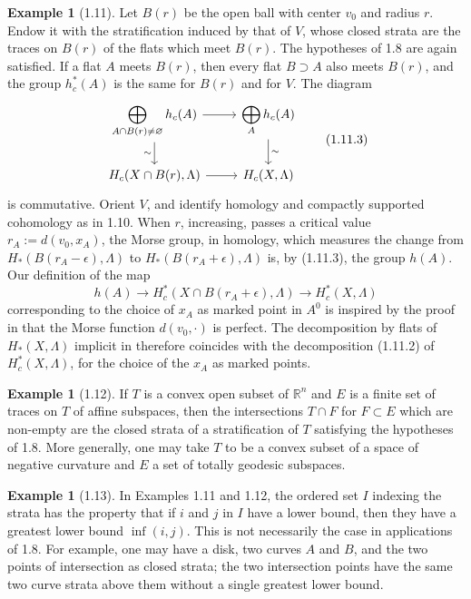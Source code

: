 \documentclass[11pt]{article}
\theoremstyle{definition}
\newtheorem{example}[theorem]{Example}
\newcommand{\RR}{\mathbb R}
\begin{document}
\begin{example}[1.11]
Let $B(r)$ be the open ball with center $v_0$ and radius $r$.  Endow it with the stratification induced by that of $V$, whose closed strata are the traces on $B(r)$ of the flats which meet $B(r)$.  The hypotheses of 1.8 are again satisfied.  If a flat $A$ meets $B(r)$, then every flat $B\supset A$ also meets $B(r)$, and the group $h_c^*(A)$ is the same for $B(r)$ and for $V$.  The diagram
\begin{equation}
\begin{tikzcd}
\displaystyle\bigoplus_{A\cap B(r)\neq\varnothing}h_c(A) \arrow[r] \arrow[d,"\sim"'] & \displaystyle\bigoplus_A h_c(A) \arrow[d,"\sim"] \\
H_c(X\cap B(r),\Lambda) \arrow[r] & H_c(X,\Lambda)
\end{tikzcd}\tag{1.11.3}
\end{equation}
is commutative.  Orient $V$, and identify homology and compactly supported cohomology as in 1.10.  When $r$, increasing, passes a critical value $r_A:=d(v_0,x_A)$, the Morse group, in homology, which measures the change from $H_*(B(r_A-\epsilon),\Lambda)$ to $H_*(B(r_A+\epsilon),\Lambda)$ is, by (1.11.3), the group $h(A)$.  Our definition of the map
\[
h(A)\longrightarrow H_c^*(X\cap B(r_A+\epsilon),\Lambda)\longrightarrow H_c^*(X,\Lambda)
\]
corresponding to the choice of $x_A$ as marked point in $A^0$ is inspired by the proof in \cite{GM} that the Morse function $d(v_0,\cdot)$ is perfect.  The decomposition by flats of $H_*(X,\Lambda)$ implicit in \cite{GM} therefore coincides with the decomposition (1.11.2) of $H_c^*(X,\Lambda)$, for the choice of the $x_A$ as marked points.
\end{example}

\begin{example}[1.12]
If $T$ is a convex open subset of $\RR^n$ and $E$ is a finite set of traces on $T$ of affine subspaces, then the intersections $T\cap F$ for $F\subset E$ which are non-empty are the closed strata of a stratification of $T$ satisfying the hypotheses of 1.8.  More generally, one may take $T$ to be a convex subset of a space of negative curvature and $E$ a set of totally geodesic subspaces.
\end{example}

\begin{example}[1.13]
In Examples 1.11 and 1.12, the ordered set $I$ indexing the strata has the property that if $i$ and $j$ in $I$ have a lower bound, then they have a greatest lower bound $\inf(i,j)$.  This is not necessarily the case in applications of 1.8.  For example, one may have a disk, two curves $A$ and $B$, and the two points of intersection as closed strata; the two intersection points have the same two curve strata above them without a single greatest lower bound.
\end{example}
\end{document}
